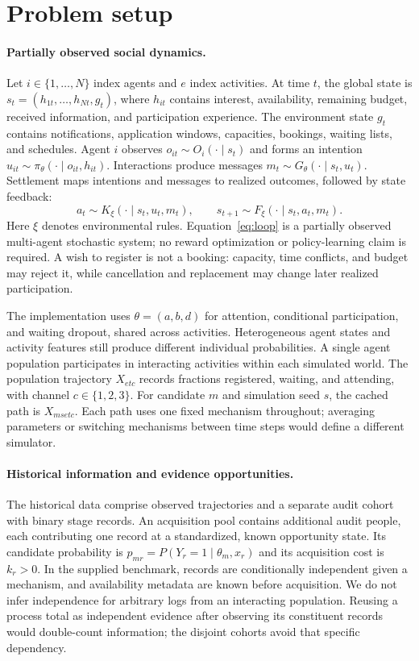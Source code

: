 \section{Problem setup}
\label{sec:setup}
\paragraph{Partially observed social dynamics.}
Let $i\in\{1,\ldots,N\}$ index agents and $e$ index activities. At time $t$, the global state is $s_t=(h_{1t},\ldots,h_{Nt},g_t)$, where $h_{it}$ contains interest, availability, remaining budget, received information, and participation experience. The environment state $g_t$ contains notifications, application windows, capacities, bookings, waiting lists, and schedules. Agent $i$ observes $o_{it}\sim O_i(\cdot\mid s_t)$ and forms an intention $u_{it}\sim\pi_\theta(\cdot\mid o_{it},h_{it})$. Interactions produce messages $m_t\sim G_\theta(\cdot\mid s_t,u_t)$. Settlement maps intentions and messages to realized outcomes, followed by state feedback:
\begin{equation}
 a_t\sim K_\xi(\cdot\mid s_t,u_t,m_t),\qquad
 s_{t+1}\sim F_\xi(\cdot\mid s_t,a_t,m_t).
 \label{eq:loop}
\end{equation}
Here $\xi$ denotes environmental rules. Equation~\eqref{eq:loop} is a partially observed multi-agent stochastic system; no reward optimization or policy-learning claim is required. A wish to register is not a booking: capacity, time conflicts, and budget may reject it, while cancellation and replacement may change later realized participation.

The implementation uses $\theta=(a,b,d)$ for attention, conditional participation, and waiting dropout, shared across activities. Heterogeneous agent states and activity features still produce different individual probabilities. A single agent population participates in interacting activities within each simulated world. The population trajectory $X_{etc}$ records fractions registered, waiting, and attending, with channel $c\in\{1,2,3\}$. For candidate $m$ and simulation seed $s$, the cached path is $X_{msetc}$. Each path uses one fixed mechanism throughout; averaging parameters or switching mechanisms between time steps would define a different simulator.

\paragraph{Historical information and evidence opportunities.}
The historical data comprise observed trajectories and a separate audit cohort with binary stage records. An acquisition pool contains additional audit people, each contributing one record at a standardized, known opportunity state. Its candidate probability is $p_{mr}=P(Y_r=1\mid\theta_m,x_r)$ and its acquisition cost is $k_r>0$. In the supplied benchmark, records are conditionally independent given a mechanism, and availability metadata are known before acquisition. We do not infer independence for arbitrary logs from an interacting population. Reusing a process total as independent evidence after observing its constituent records would double-count information; the disjoint cohorts avoid that specific dependency.

